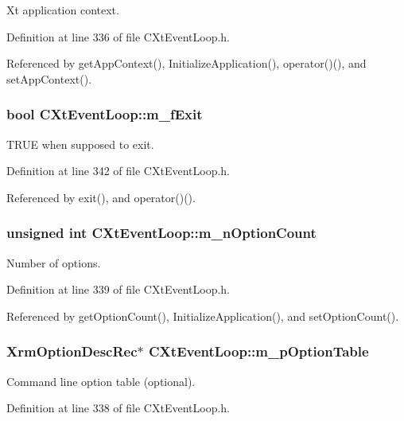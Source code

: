 Xt application context.



Definition at line 336 of file CXt\-Event\-Loop.h.

Referenced by get\-App\-Context(), Initialize\-Application(), operator()(), and set\-App\-Context().
\subsubsection{\setlength{\rightskip}{0pt plus 5cm}bool CXt\-Event\-Loop::m\_\-f\-Exit\hspace{0.3cm}{\tt  [private]}}\label{classCXtEventLoop_o6}


TRUE when supposed to exit.



Definition at line 342 of file CXt\-Event\-Loop.h.

Referenced by exit(), and operator()().
\subsubsection{\setlength{\rightskip}{0pt plus 5cm}unsigned int CXt\-Event\-Loop::m\_\-n\-Option\-Count\hspace{0.3cm}{\tt  [private]}}\label{classCXtEventLoop_o3}


Number of options.



Definition at line 339 of file CXt\-Event\-Loop.h.

Referenced by get\-Option\-Count(), Initialize\-Application(), and set\-Option\-Count().
\subsubsection{\setlength{\rightskip}{0pt plus 5cm}Xrm\-Option\-Desc\-Rec$\ast$ CXt\-Event\-Loop::m\_\-p\-Option\-Table\hspace{0.3cm}{\tt  [private]}}\label{classCXtEventLoop_o2}


Command line option table (optional).



Definition at line 338 of file CXt\-Event\-Loop.h.

